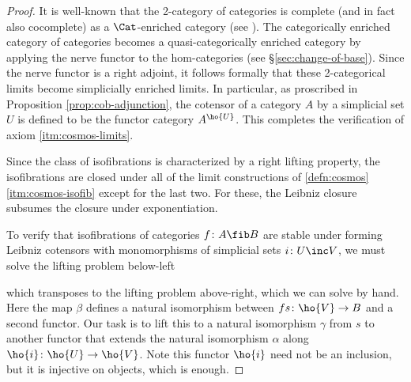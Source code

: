 \begin{proof}
It is well-known that the 2-category of categories is complete (and in fact also cocomplete) as a $\Cat$-enriched category (see %
  \cite{Kelly:1989eo}). The categorically enriched category of categories becomes a quasi-categorically enriched category by applying the nerve functor to the hom-categories (see \S\ref{sec:change-of-base}). Since the nerve functor is a right adjoint, it follows formally that these 2-categorical limits become simplicially enriched limits. In particular, as proscribed in Proposition \ref{prop:cob-adjunction}, the cotensor of a category $A$ by a simplicial set $U$ is defined to be the functor category $A^{\ho{U}}$. This completes the verification of axiom \ref{itm:cosmos-limits}.

Since the class of isofibrations is characterized by a right lifting property, %
  the isofibrations are closed under all of the limit constructions of  \ref{defn:cosmos}\ref{itm:cosmos-isofib} except for the last two. %
  For these, the Leibniz closure subsumes the closure under exponentiation.

To verify that isofibrations of categories $f \colon A \fib B$ are stable under forming Leibniz cotensors with monomorphisms of simplicial sets $i \colon U \inc V$, we must solve the lifting problem below-left
\begin{center}
\end{center}
which transposes to the lifting problem above-right, which we can solve by hand. Here the map $\beta$ defines a natural isomorphism between $fs \colon \ho{V} \to B$ and a second functor. Our task is to lift this to a natural isomorphism $\gamma$ from $s$ to another functor that extends the natural isomorphism $\alpha$ along $\ho{i} \colon \ho{U} \to \ho{V}$. Note this functor $\ho{i}$ need not be an inclusion, but it is injective on objects, which is enough.


\end{proof}
